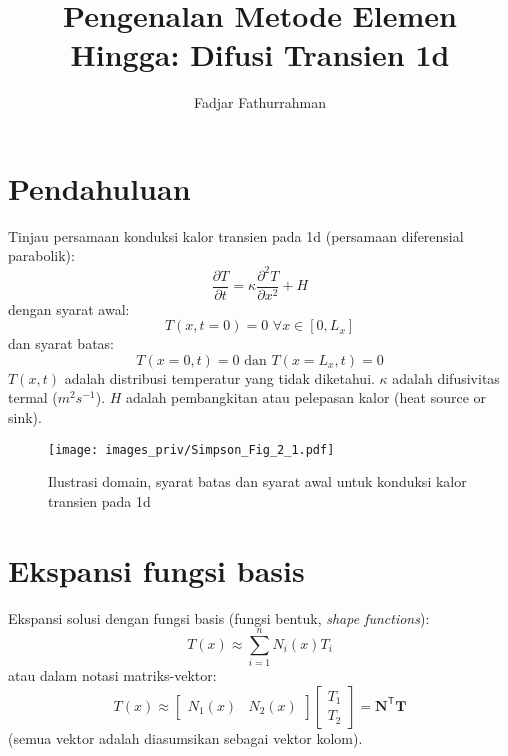 %




\title{Pengenalan Metode Elemen Hingga: Difusi Transien 1d}
\author{Fadjar Fathurrahman}
\date{}
\maketitle

\section*{Pendahuluan}

Tinjau persamaan konduksi kalor transien pada 1d (persamaan diferensial parabolik):
\begin{equation*}
\frac{\partial T}{\partial t} = \kappa \frac{\partial^2 T}{\partial x^2} + H
\end{equation*}
dengan syarat awal:
\begin{equation*}
T(x,t=0) = 0 \,\, \forall x \in [0,L_{x}]
\end{equation*}
dan syarat batas:
\begin{equation*}
T(x=0,t) = 0 \,\, \text{dan} \,\, T(x=L_{x},t) = 0
\end{equation*}
$T(x,t)$ adalah distribusi temperatur yang tidak diketahui.
$\kappa$ adalah difusivitas termal ($m^2 s^{-1}$).
$H$ adalah pembangkitan atau pelepasan kalor (heat source or sink).

\begin{figure}[h]
{\centering
\texttt{[image: images\_priv/Simpson\_Fig\_2\_1.pdf]}
\par}
\caption{Ilustrasi domain, syarat batas dan syarat awal untuk konduksi kalor transien pada
1d}
\end{figure}


\section*{Ekspansi fungsi basis}
Ekspansi solusi dengan fungsi basis (fungsi bentuk, \textit{shape functions}):
\begin{equation*}
T(x) \approx \sum_{i=1}^{n} N_{i}(x) T_{i}
\end{equation*}
atau dalam notasi matriks-vektor:
\begin{equation*}
T(x) \approx \begin{bmatrix}
N_{1}(x) & N_{2}(x)
\end{bmatrix} \begin{bmatrix}
T_{1} \\ T_{2}
\end{bmatrix} = \mathbf{N}^{\mathsf{T}} \mathbf{T}
\end{equation*}
(semua vektor adalah diasumsikan sebagai vektor kolom).

